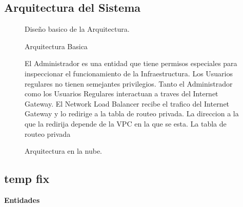 \documentclass{article}
\begin{document}
  \subsection{Arquitectura del Sistema}
  \begin{figure}[!htb]
    \begin{center}
      
    \end{center}
    \caption{Arquitectura Basica}\label{fig: }
  Dise\~no basico de la Arquitectura.
  \end{figure}

  \begin{figure}[!htb]
    \begin{center}
      
    \end{center}
    \caption{Arquitectura en la nube.}\label{fig: Implementacion en la Nube}
    El Administrador es una entidad que tiene permisos especiales para inspeccionar el funcionamiento de la Infraestructura.
    Los Usuarios regulares no tienen semejantes privilegios.
    Tanto el Administrador como los Usuarios Regulares interactuan a traves del Internet Gateway.
    El Network Load Balancer recibe el trafico del Internet Gateway y lo redirige a la tabla de routeo privada. La direccion a la que la redirija depende de la VPC en la que se esta.
    La tabla de routeo privada 

  \end{figure}
  \subsection{temp fix}
  \textbf{ Entidades }
      \iffalse{
    NOTE 1—Design attributes can be thought of as questions about design elements. The answers to those questions are
    the values of the attributes. All the questions can be answered, but the content of the answer will depend upon the
    nature of the entity. The collection of answers provides a complete description of an entity. Attribute descriptions
    should include references and design considerations such as tradeoffs and assumptions when appropriate. In some
    cases, attribute descriptions may have the value none.
    NOTE 2—Design attributes have been generalized from the concept of design entity attribute (which appeared in
    IEEE Std 1016-1998 and applied only to design entities) to apply to design entities, design relationships, and design
    constraints.
    NOTE 3—Use of the design attributes in 4.6.2.1 through 4.6.2.3 ensures compatibility with IEEE Std 1016-1998. Other
    design attributes required as a part of specific design viewpoints are defined with those viewpoints in Clause 5. Some
    design attributes [such as subordinates (see 5.3.2.2)] can be more usefully represented as design relationships. This was
    endif
      } \fi 
\end{document}
